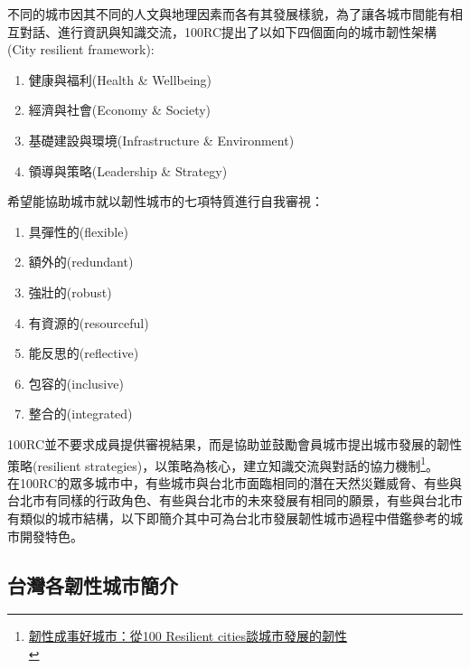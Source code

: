 \documentclass[a4paper,12pt]{article}
\begin{document}
不同的城市因其不同的人文與地理因素而各有其發展樣貌，為了讓各城市間能有相互對話、進行資訊與知識交流，100RC提出了以如下四個面向的城市韌性架構(City resilient framework):\\
\begin{enumerate}
\item 健康與福利(Health \& Wellbeing)\\
\item 經濟與社會(Economy \& Society)\\
\item 基礎建設與環境(Infrastructure \& Environment)\\
\item 領導與策略(Leadership \& Strategy)\\
\end{enumerate}
希望能協助城市就以韌性城市的七項特質進行自我審視：\\
\begin{enumerate}
\item 具彈性的(flexible)\\
\item 額外的(redundant)\\
\item 強壯的(robust)\\
\item 有資源的(resourceful)\\
\item 能反思的(reflective)\\
\item 包容的(inclusive)\\
\item 整合的(integrated)\\
\end{enumerate}
100RC並不要求成員提供審視結果，而是協助並鼓勵會員城市提出城市發展的韌性策略(resilient strategies)，以策略為核心，建立知識交流與對話的協力機制\footnote{\href{https://eyesonplace.net/2018/12/10/9521/}{韌性成事好城市：從100 Resilient cities談城市發展的韌性}\\\label{org58053f5}}。\\

在100RC的眾多城市中，有些城市與台北市面臨相同的潛在天然災難威脅、有些與台北市有同樣的行政角色、有些與台北市的未來發展有相同的願景，有些與台北市有類似的城市結構，以下即簡介其中可為台北市發展韌性城市過程中借鑑參考的城市開發特色。\\
\newpage

\subsection{台灣各韌性城市簡介}
\label{sec:org9bce065}
\end{document}

